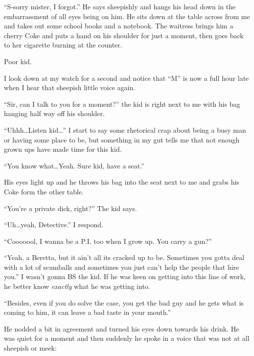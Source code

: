 ``S-sorry mister, I forgot.'' He says sheepishly and hangs his head
down in the embarrassment of all eyes being on him. He sits down at
the table across from me and takes out some school books and a
notebook. The waitress brings him a cherry Coke and puts a hand on
his shoulder for just a moment, then goes back to her cigarette
burning at the counter.



Poor kid.



I look down at my watch for a second and notice that ``M'' is now a
full hour late when I hear that sheepish little voice again.



``Sir, can I talk to you for a moment?'' the kid is right next to me
with his bag hanging half way off his shoulder.



``Uhhh{\ldots}Listen kid{\ldots}'' I start to say some rhetorical crap about
being a busy man or having some place to be, but something in my
gut tells me that not enough grown ups have made time for this
kid.



``You know what{\ldots}Yeah. Sure kid, have a seat.''

His eyes light up and he throws his bag into the seat next to me
and grabs his Coke form the other table.



``You're a private dick, right?'' The kid says.



``Uh{\ldots}yeah, Detective.'' I respond.



``Cooooool, I wanna be a P.I. too when I grow up. You carry a
gun?''



``Yeah, a Beretta, but it ain't all its cracked up to be. Sometimes
you gotta deal with a lot of scumballs and sometimes you just can't
help the people that hire you.'' I wasn't gonna BS the kid. If he
was keen on getting into this line of work, he better know
{\em exactly} what he was getting into.



``Besides, even if you do solve the case, you get the bad guy and he
gets what is coming to him, it can leave a bad taste in your
mouth.''



He nodded a bit in agreement and turned his eyes down towards his
drink. He was quiet for a moment and then suddenly he spoke in a
voice that was not at all sheepish or meek:



